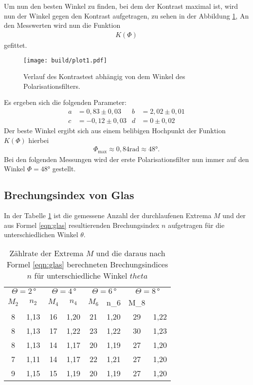 Um nun den besten Winkel zu finden, bei dem der Kontrast maximal ist, wird
nun der Winkel gegen den Kontrast aufgetragen, zu sehen in der Abbildung \ref{fig:kontrast},
An den Messwerten wird nun die Funktion
\begin{align}
  K\left(\Phi\right) %
\end{align}
gefittet.

\begin{figure}
    \centering
    \texttt{[image: build/plot1.pdf]}
    \caption{Verlauf des Kontrastest abhängig von dem Winkel des Polarisationsfilters.}
    \label{fig:kontrast}
\end{figure}

Es ergeben sich die folgenden Parameter:
\begin{align*}
  a&=0,83\pm0,03
  &b&=2,02\pm0,01\\
  c&=-0,12\pm0,03
  &d&=0\pm0,02
\end{align*}
Der beste Winkel ergibt sich aus einem belibigen
Hochpunkt der Funktion $K(\Phi)$ hierbei
\begin{align*}
 \Phi_\mathrm{max}\approx0,84\si{\radian}\approx48\si{\degree}.
\end{align*}
Bei den folgenden Messungen wird der erste Polarisationsfilter
nun immer auf den Winkel $\Phi=48\si{\degree}$ gestellt.


\subsection{Brechungsindex von Glas}
In der Tabelle \ref{tab:glas} ist die gemessene Anzahl der durchlaufenen Extrema $M$
und der aus Formel \eqref{eqn:glas} resultierenden Brechungsindex $n$ aufgetragen
für die unterschiedlichen Winkel $\theta$.

\begin{table}
  \begin{tabular}{c c | c c | c c | c c}
\caption{Zählrate der Extrema $M$ und die daraus nach Formel \eqref{eqn:glas} berechneten Brechungsindices $n$ für unterschiedliche Winkel $theta$}
\label{tab:glas}
    \toprule
\multicolumn{2}{c}{$\Theta=2\,\si{\degree}$}  &  \multicolumn{2}{c}{$\Theta=4\,\si{\degree}$} & \multicolumn{2}{c}{$\Theta=6\,\si{\degree}$} & \multicolumn{2}{c}{$\Theta=8\,\si{\degree}$}\\
      $M_2$ &  $n_2$ &  $M_4$ & $n_4$ & $M_6$ &  n\_6 & M_8 \\
  \midrule
       8 &  1,13 &  16 &  1,20 & 21 & 1,20 & 29 & 1,22\\
       8 &  1,13 &  17 &  1,22 & 23 & 1,22 & 30 & 1,23\\
       8 &  1,13 &  14 &  1,17 & 20 & 1,19 & 27 & 1,20\\
       7 &  1,11 &  14 &  1,17 & 22 & 1,21 & 27 & 1,20\\
       9 &  1,15 &  15 &  1,19 & 20 & 1,19 & 27 & 1,20\\
  \bottomrule
  \end{tabular}
\end{table}


